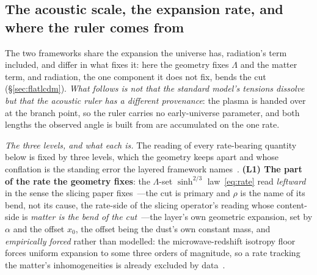 \documentclass[11pt,a4paper]{article}
\theoremstyle{plain}
\theoremstyle{definition}
\theoremstyle{remark}
\begin{document}
\subsection{The acoustic scale, the expansion rate, and where the ruler comes from}\label{sec:tensions}
The two frameworks share the expansion the universe has, radiation's term included, and differ in what fixes it: here the geometry fixes $\Lambda$ and the matter term, and radiation, the one component it does not fix, bends the cut (\S\ref{sec:flatlcdm}). \emph{What follows is not that the standard model's tensions dissolve but that the acoustic ruler has a different provenance}: the plasma is handed over at the branch point, so the ruler carries no early-universe parameter, and both lengths the observed angle is built from are accumulated on the one rate.

\emph{The three levels, and what each is.} The reading of every rate-bearing quantity below is fixed by three levels, which the geometry keeps apart and whose conflation is the standing error the layered framework names~\cite{JanzenCRframework}. \textbf{(L1) The part of the rate the geometry fixes}: the $\Lambda$-set $\sinh^{2/3}$ law~\eqref{eq:rate} read \emph{leftward} in the sense the slicing paper fixes~\cite{JanzenOperator}---the cut is primary and $\rho$ is the name of its bend, not its cause, the rate-side of the slicing operator's reading whose content-side is \emph{matter is the bend of the cut}~\cite{JanzenOperator}---the layer's own geometric expansion, set by $\alpha$ and the offset $x_{0}$, the offset being the dust's own constant mass, and \emph{empirically forced} rather than modelled: the microwave-redshift isotropy floor forces uniform expansion to some three orders of magnitude, so a rate tracking the matter's inhomogeneities is already excluded by data~\cite{JanzenModernParallax}. 
\end{document}
